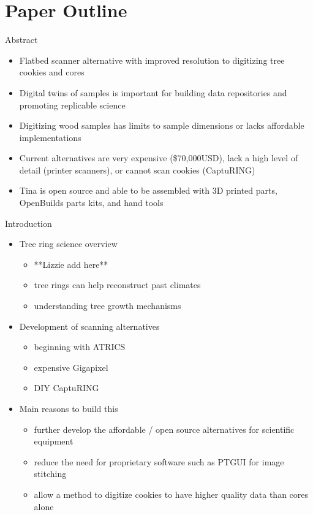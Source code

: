 \documentclass{article}
\begin{document}
\section {Paper Outline}
\begin{outline}[itemize]

\1 Abstract
\begin{itemize}
	\item Flatbed scanner alternative with improved resolution to digitizing tree cookies and cores
	\item Digital twins of samples is important for building data repositories and promoting replicable science
	\item Digitizing wood samples has limits to sample dimensions or lacks affordable implementations
	\item 	Current alternatives are very expensive (\$70,000USD), lack a high level of detail (printer scanners), or cannot scan cookies (CaptuRING)
	\item Tina is open source and able to be assembled with 3D printed parts, OpenBuilds parts kits, and hand tools
\end{itemize}
\item Introduction
	\begin{itemize}
	\item Tree ring science overview
		\begin{itemize}
		\item **Lizzie add here**
		\item tree rings can help reconstruct past climates 
		\item understanding tree growth mechanisms
		\end{itemize}
	\item Development of scanning alternatives
		\begin{itemize}
		\item beginning with ATRICS
		\item expensive Gigapixel
		\item DIY CaptuRING
		\end{itemize}
	\item Main reasons to build this 
		\begin{itemize}
		\item further develop the affordable / open source alternatives for scientific equipment
		\item reduce the need for proprietary software such as PTGUI for image stitching
		\item allow a method to digitize cookies to have higher quality data than cores alone

\end{itemize}
\end{itemize}
\end{outline}
\end{document}
